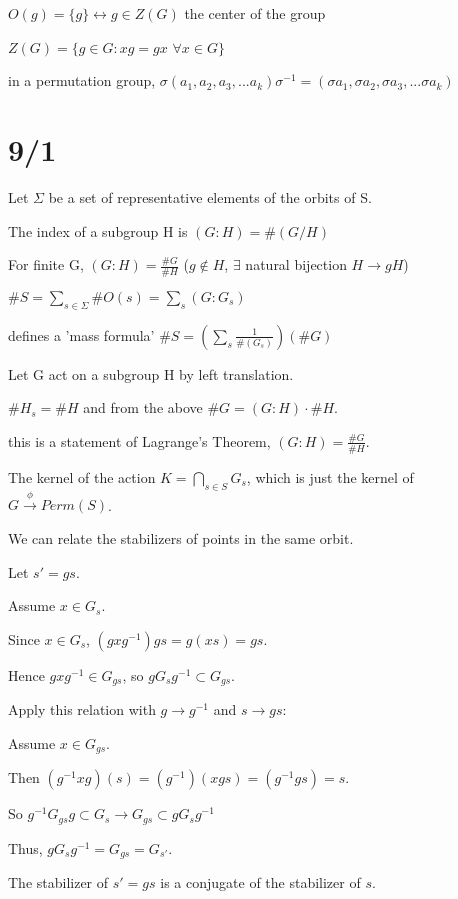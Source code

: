 \documentclass[12pt]{article}
\newcommand{\inv}{^{-1}}
\begin{document}
$O(g) = \{g\} \leftrightarrow g \in Z(G)$ the center of the group

$Z(G) = \{g \in G : xg = gx$ $\forall x \in G\}$

in a permutation group, $\sigma (a_1, a_2, a_3, ... a_k) \sigma^{-1} = (\sigma a_1, \sigma a_2, \sigma a_3, ... \sigma a_k)$

\section{9/1}

\noindent
Let $\Sigma$ be a set of representative elements of the orbits of S.

The index of a subgroup H is $(G : H) = \#(G/H)$

For finite G, $(G:H) = \frac{\#G}{\#H}$ ($g \not \in H$, $\exists$ natural bijection $H \to gH$)

$\#S = \sum_{s \in \Sigma}\#O(s) = \sum_s(G:G_s)$

defines a 'mass formula' $\#S = (\sum_s\frac{1}{\#(G_s)})(\#G)$

\noindent
Let G act on a subgroup H by left translation.

$\#H_s = \#H$ and from the above $\#G = (G:H) \cdot \#H$. 

this is a statement of Lagrange's Theorem, $(G:H) = \frac{\#G}{\#H}$.

\noindent
The kernel of the action $K = \bigcap_{s \in S}G_s$, which is just the kernel of $G \xrightarrow{\phi} Perm(S)$.

\noindent
We can relate the stabilizers of points in the same orbit.

Let $s' = gs$.

Assume $x \in G_s$.  

Since $x \in G_s$, $(gxg^{-1})gs = g(xs) = gs$.

Hence $gxg^{-1} \in G_{gs}$, so $gG_sg^{-1} \subset G_{gs}$.

Apply this relation with $g \to g^{-1}$ and $s \to gs$:

Assume $x \in G_{gs}$.

Then $(g\inv xg)(s) = (g\inv)(xgs) = (g\inv gs) = s$.

So $g\inv G_{gs}g \subset G_s \to G_{gs} \subset gG_sg\inv$

\noindent
Thus, $gG_sg\inv = G_{gs} = G_{s'}$.

The stabilizer of $s'=gs$ is a conjugate of the stabilizer of $s$.\\
\end{document}
